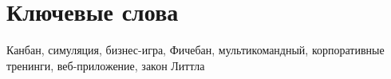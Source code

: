 \documentclass[a4paper,12pt]{extarticle}
\begin{document}
\newpage
\setcounter{page}{2}

{
	\hypersetup{linkcolor=black}
	\tableofcontents
}

\newpage

\newpage


\section*{Ключевые слова}
Канбан, симуляция, бизнес-игра, Фичебан, мультикомандный, корпоративные тренинги, веб-приложение, закон Литтла

\newpage


\newpage


\newpage


\newpage


\newpage


\newpage


\newpage


\newpage


\newpage 
\printbibliography[heading=bibintoc] 

\end{document}
